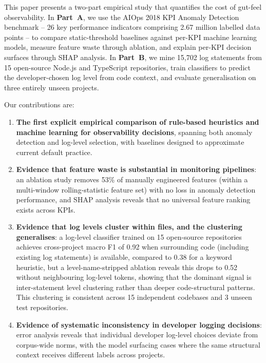 \documentclass[10pt,twocolumn]{article}
\begin{document}
This paper presents a two-part empirical study that quantifies the cost of gut-feel observability. In \textbf{Part~A}, we use the AIOps 2018 KPI Anomaly Detection benchmark -- 26 key performance indicators comprising 2.67 million labelled data points -- to compare static-threshold baselines against per-KPI machine learning models, measure feature waste through ablation, and explain per-KPI decision surfaces through SHAP analysis. In \textbf{Part~B}, we mine 15,702 log statements from 15 open-source Node.js and TypeScript repositories, train classifiers to predict the developer-chosen log level from code context, and evaluate generalisation on three entirely unseen projects.

Our contributions are:

\begin{enumerate}
  \item \textbf{The first explicit empirical comparison of rule-based heuristics and machine learning for observability decisions}, spanning both anomaly detection and log-level selection, with baselines designed to approximate current default practice.

  \item \textbf{Evidence that feature waste is substantial in monitoring pipelines}: an ablation study removes 53\% of manually engineered features (within a multi-window rolling-statistic feature set) with no loss in anomaly detection performance, and SHAP analysis reveals that no universal feature ranking exists across KPIs.

  \item \textbf{Evidence that log levels cluster within files, and the clustering generalises}: a log-level classifier trained on 15 open-source repositories achieves cross-project macro F1 of 0.92 when surrounding code (including existing log statements) is available, compared to 0.38 for a keyword heuristic, but a level-name-stripped ablation reveals this drops to 0.52 without neighbouring log-level tokens, showing that the dominant signal is inter-statement level clustering rather than deeper code-structural patterns. This clustering is consistent across 15 independent codebases and 3 unseen test repositories.

  \item \textbf{Evidence of systematic inconsistency in developer logging decisions}: error analysis reveals that individual developer log-level choices deviate from corpus-wide norms, with the model surfacing cases where the same structural context receives different labels across projects.
\end{enumerate}
\end{document}
